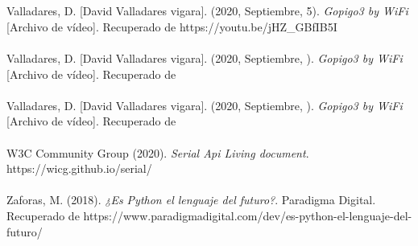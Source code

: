 \documentclass{report}
\begin{document}
\\
\\
Valladares, D. [David Valladares vigara]. (2020, Septiembre, 5). \textit{Gopigo3 by WiFi} [Archivo de vídeo]. Recuperado de https://youtu.be/jHZ\_GBfIB5I
\\
\\
Valladares, D. [David Valladares vigara]. (2020, Septiembre, ). \textit{Gopigo3 by WiFi} [Archivo de vídeo]. Recuperado de
\\
\\
Valladares, D. [David Valladares vigara]. (2020, Septiembre, ). \textit{Gopigo3 by WiFi} [Archivo de vídeo]. Recuperado de
\\
\\
W3C Community Group (2020). \textit{Serial Api Living document}. https://wicg.github.io/serial/
\\
\\
Zaforas, M. (2018). \textit{¿Es Python el lenguaje del futuro?}. Paradigma Digital. Recuperado de https://www.paradigmadigital.com/dev/es-python-el-lenguaje-del-futuro/
\end{document}
